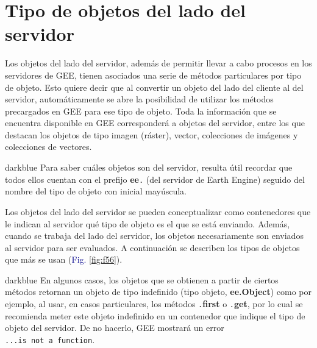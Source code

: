 \documentclass[
  12pt,
  letterpaper,
  twoside]{book}
\newcommand\boldpurple[1]{\textcolor{darkpurple}{\textbf{#1}}}
\begin{document}
\hypertarget{tipo-de-objetos-del-lado-del-servidor}{%
\section{Tipo de objetos del lado del servidor}\label{tipo-de-objetos-del-lado-del-servidor}}

Los objetos del lado del servidor, además de permitir llevar a cabo procesos en los servidores de GEE, tienen asociados una serie de métodos particulares por tipo de objeto. Esto quiere decir que al convertir un objeto del lado del cliente al del servidor, automáticamente se abre la posibilidad de utilizar los métodos precargados en GEE para ese tipo de objeto. Toda la información que se encuentra disponible en GEE corresponderá a objetos del servidor, entre los que destacan los objetos de tipo imagen (ráster), vector, colecciones de imágenes y colecciones de vectores.

\begin{bluebox2}

\begin{awesomeblock}{5pt}{\faLightbulb}{darkblue}
Para saber cuáles objetos son del servidor, resulta útil recordar que todos ellos cuentan con el prefijo \boldpurple{ee}\texttt{.} (del servidor de Earth Engine) seguido del nombre del tipo de objeto con inicial mayúscula.

\end{awesomeblock}

\end{bluebox2}

Los objetos del lado del servidor se pueden conceptualizar como contenedores que le indican al servidor qué tipo de objeto es el que se está enviando. Además, cuando se trabaja del lado del servidor, los objetos necesariamente son enviados al servidor para ser evaluados. A continuación se describen los tipos de objetos que más se usan (\textcolor{darkblue}{Fig.} \ref{fig:f56}).

\begin{bluebox2}

\begin{awesomeblock}{5pt}{\faLightbulb}{darkblue}
En algunos casos, los objetos que se obtienen a partir de ciertos métodos retornan un objeto de tipo indefinido (tipo objeto, \boldpurple{ee.Object}) como por ejemplo, al usar, en casos particulares, los métodos \texttt{.}\boldpurple{first} o \texttt{.}\boldpurple{get}, por lo cual se recomienda meter este objeto indefinido en un contenedor que indique el tipo de objeto del servidor. De no hacerlo, GEE mostrará un error \texttt{...is\ not\ a\ function}.

\end{awesomeblock}

\end{bluebox2}
\end{document}
